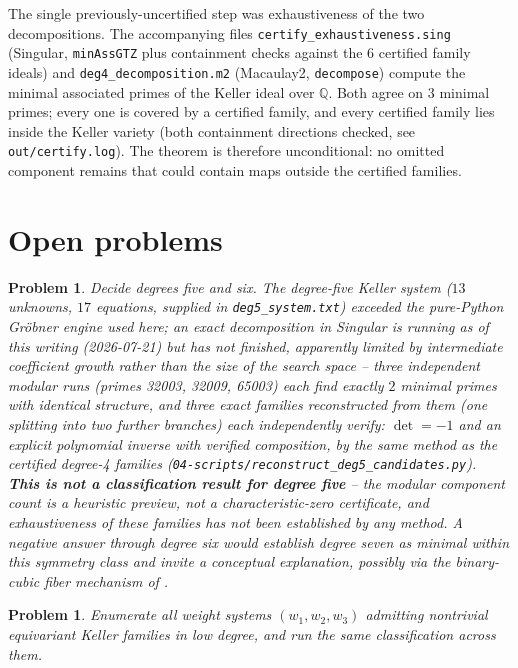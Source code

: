 \documentclass[11pt]{article}
\newtheorem{problem}[theorem]{Problem}
\begin{document}
The single previously-uncertified step was exhaustiveness of the two
decompositions. The accompanying files \texttt{certify\_exhaustiveness.sing}
(Singular, \texttt{minAssGTZ} plus containment checks against the 6 certified
family ideals) and \texttt{deg4\_decomposition.m2} (Macaulay2,
\texttt{decompose}) compute the minimal associated primes of the Keller ideal
over $\mathbb{Q}$. Both agree on 3 minimal primes; every one is covered by a
certified family, and every certified family lies inside the Keller variety
(both containment directions checked, see \texttt{out/certify.log}). The
theorem is therefore unconditional: no omitted component remains that could
contain maps outside the certified families.

\section{Open problems}

\begin{problem}
Decide degrees five and six. The degree-five Keller system ($13$ unknowns,
$17$ equations, supplied in \texttt{deg5\_system.txt}) exceeded the pure-Python
Gr\"obner engine used here; an exact decomposition in Singular is running as
of this writing (2026-07-21) but has not finished, apparently limited by
intermediate coefficient growth rather than the size of the search space --
three independent modular runs (primes 32003, 32009, 65003) each find exactly
$2$ minimal primes with identical structure, and three exact families
reconstructed from them (one splitting into two further branches) each
independently verify: $\det=-1$ and an explicit polynomial inverse with
verified composition, by the same method as the certified degree-4 families
(\texttt{04-scripts/reconstruct\_deg5\_candidates.py}). \textbf{This is not a
classification result for degree five} -- the modular component count is a
heuristic preview, not a characteristic-zero certificate, and exhaustiveness
of these families has not been established by any method. A negative answer
through degree six would establish degree seven as minimal within this
symmetry class and invite a conceptual explanation, possibly via the
binary-cubic fiber mechanism of \cite{ulam2026}.
\end{problem}

\begin{problem}
Enumerate all weight systems $(w_1,w_2,w_3)$ admitting nontrivial equivariant
Keller families in low degree, and run the same classification across them.
\end{problem}
\end{document}
